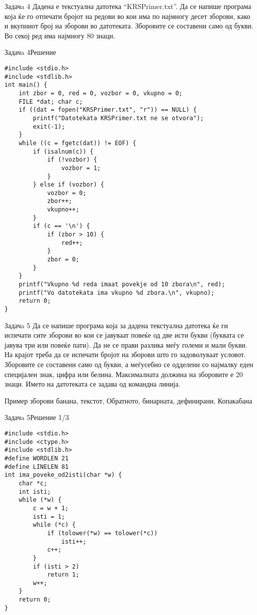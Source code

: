 \begin{frame}{Задачa 4}
Дадена е текстуална датотека ``KRSPrimer.txt''. Да се напише програма која ќе го
отпечати бројот на редови во кои има по најмногу десет зборови, како и вкупниот
број на зборови во датотеката. Зборовите се составени само од букви. Во секој
ред има најмногу 80 знаци.
\end{frame}

\begin{frame}[fragile]{Задачa 4}{Решение}
\begin{lstlisting}
#include <stdio.h>
#include <stdlib.h>
int main() {
    int zbor = 0, red = 0, vozbor = 0, vkupno = 0;
    FILE *dat; char c; 
    if ((dat = fopen("KRSPrimer.txt", "r")) == NULL) {
        printf("Datotekata KRSPrimer.txt ne se otvora");
        exit(-1);
    }
    while ((c = fgetc(dat)) != EOF) {
        if (isalnum(c)) {
            if (!vozbor) {
                vozbor = 1;
            }
        } else if (vozbor) {
            vozbor = 0;
            zbor++;
            vkupno++;
        }
        if (c == '\n') {
            if (zbor > 10) {
                red++;
            }
            zbor = 0;
        }
    }
    printf("Vkupno %d reda imaat povekje od 10 zbora\n", red);
    printf("Vo datotekata ima vkupno %d zbora.\n", vkupno);
    return 0;
}
\end{lstlisting}
\end{frame}

\begin{frame}{Задачa 5}
Да се напише програма која за дадена текстуална датотека ќе ги испечати
сите зборови во кои се јавуваат повеќе од две исти букви (буквата се јавува три или
повеќе пати). Да не се прави разлика меѓу големи и мали букви. На крајот треба
да се испечати бројот на зборови што го задоволуваат условот. Зборовите се
составени само од букви, а меѓусебно се одделени со најмалку еден специјален
знак, цифра или белина. Максималната должина на зборовите е 20 знаци. Името на
датотеката се задава од командна линија. 
\begin{exampleblock}{Пример зборови}
банана, текстот, Обратното, бинарната, дефинирани, Копакабана
\end{exampleblock}
\end{frame}

\begin{frame}[fragile]{Задачa 5}{Решение 1/3}
\begin{lstlisting}
#include <stdio.h>
#include <ctype.h>
#include <stdlib.h>
#define WORDLEN 21
#define LINELEN 81
int ima_poveke_od2isti(char *w) {
    char *c;
    int isti;
    while (*w) {
        c = w + 1;
        isti = 1;
        while (*c) {
            if (tolower(*w) == tolower(*c))
                isti++;
            c++;
        }
        if (isti > 2)
            return 1;
        w++;
    }
    return 0;
}
\end{lstlisting}
\end{frame}

